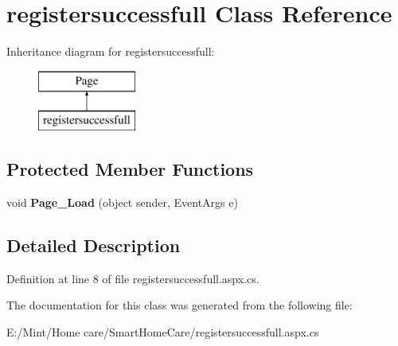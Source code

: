\hypertarget{classregistersuccessfull}{\section{registersuccessfull Class Reference}
\label{classregistersuccessfull}
}
Inheritance diagram for registersuccessfull\-:\begin{figure}[H]
\begin{center}
\leavevmode
\includegraphics[height=2.000000cm]{classregistersuccessfull}
\end{center}
\end{figure}
\subsection*{Protected Member Functions}
\begin{DoxyCompactItemize}
\item 
\hypertarget{classregistersuccessfull_a0c36ad0fd253d47c27ebf267ad8fa010}{void {\bfseries Page\-\_\-\-Load} (object sender, Event\-Args e)}\label{classregistersuccessfull_a0c36ad0fd253d47c27ebf267ad8fa010}

\end{DoxyCompactItemize}


\subsection{Detailed Description}


Definition at line 8 of file registersuccessfull.\-aspx.\-cs.



The documentation for this class was generated from the following file\-:\begin{DoxyCompactItemize}
\item 
E\-:/\-Mint/\-Home care/\-Smart\-Home\-Care/registersuccessfull.\-aspx.\-cs\end{DoxyCompactItemize}
